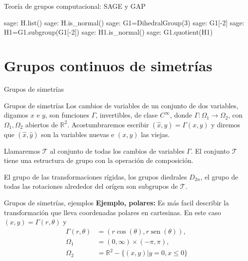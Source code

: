\documentclass[handout,hyperref={colorlinks=true}]{beamer}
\newcommand{\rr}{\mathbb{R}}
\DeclareMathOperator{\sen}{sen}
\newcommand{\nl}{\onslide<+-> }
\begin{document}
\begin{frame}[fragile]{Teoría de grupos computacional: SAGE y GAP}
\begin{sagecommandline}
sage: H.list()
sage: H.is_normal()
sage: G1=DihedralGroup(3)
sage: G1[-2]
sage: H1=G1.subgroup(G1[-2])
sage: H1.is_normal()
sage: G1.quotient(H1)
\end{sagecommandline}
\end{frame}


\section[Simetrías]{Grupos continuos de simetrías}

\begin{frame}{Grupos de simetrías}
\nl\begin{block}{Grupos de simetrías}
Los cambios de variables de un conjunto de dos variables, digamos $x$ e $y$, son funciones $\Gamma$, invertibles,  de clase $C^{\infty}$, donde $\Gamma:\Omega_1\to\Omega_2$, con $\Omega_1,\Omega_2$ abiertos de $\rr^2$. \nl Acostumbraremos escribir $(\hat{x},\hat{y})=\Gamma(x,y)$ y diremos que $(\hat{x},\hat{y})$ son la variables nuevas e $(x,y)$ las viejas.

\nl Llamaremos $\mathscr{T}$ al conjunto de todas los cambios de variables $\Gamma$. 
El conjunto  $\mathscr{T}$ tiene una estructura de grupo con la operación de composición.

\nl El grupo de las transformaciones rígidas, los grupos diedrales $D_{2n}$, el grupo de todas las rotaciones alrededor del orígen son subgrupos de  $\mathscr{T}$.

\end{block}


\end{frame}


\begin{frame}{Grupos de simetrías, ejemplos}
\textbf{Ejemplo, polares:} Es más facil describir la transformación que lleva coordenadas polares en cartesinas. En este caso $(x,y)=\Gamma(r,\theta)$ y
\[
\begin{array}{ll}
\Gamma(r,\theta)&=(r\cos(\theta),r\sen(\theta)),\\
\Omega_1&=(0,\infty)\times (-\pi,\pi),\\
\Omega_2&=\rr^2-\{(x,y)|y=0,x\leq 0\}\\
\end{array}
\]

\end{frame}
\end{document}
